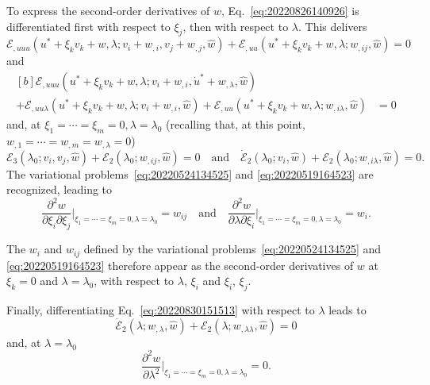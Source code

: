 \documentclass[12pt, final]{scrartcl}
\theoremstyle{definition}
\newcommand{\E}{\mathcal E}
\begin{document}
To express the second-order derivatives of $w$, Eq.~\eqref{eq:20220826140926}
is differentiated first with respect to $\xi_j$, then with respect to
$\lambda$. This delivers
\begin{equation}
  \E_{,uuu}(u^\ast + \xi_k v_k + w, \lambda; v_i + w_{,i}, v_j + w_{,j}, \hat{w}) + \E_{,uu}(u^\ast + \xi_k v_k + w, \lambda; w_{,ij}, \hat{w}) = 0
\end{equation}
and
\begin{equation}
  \begin{aligned}[b]
    \E_{,uuu}(u^\ast + \xi_k v_k + w, \lambda; v_i + w_{,i}, \dot{u}^\ast + w_{,\lambda}, \hat{w}) &\\
    + \E_{,uu\lambda}(u^\ast + \xi_k v_k + w, \lambda; v_i + w_{,i}, \hat{w}) + \E_{,uu}(u^\ast + \xi_k v_k + w, \lambda; w_{,i\lambda}, \hat{w}) &= 0
  \end{aligned}
\end{equation}
and, at $\xi_1 = \cdots = \xi_m = 0, \lambda = \lambda_0$ (recalling that, at this point,
$w_{,1} = \cdots = w_{, m} = w_{,\lambda} = 0$)
\begin{equation}
  \E_3(\lambda_0; v_i, v_j, \hat{w}) + \E_2(\lambda_0; w_{,ij}, \hat{w}) = 0
  \quad \text{and} \quad
  \dot{\E}_2(\lambda_0; v_i, \hat{w}) + \E_2(\lambda_0; w_{,i\lambda}, \hat{w}) = 0.
\end{equation}
The variational problems~\eqref{eq:20220524134525} and \eqref{eq:20220519164523}
are recognized, leading to
\begin{equation}
  \frac{\partial^2w}{\partial\xi_i \partial\xi_j}\biggr\rvert_{\xi_1 = \cdots = \xi_m = 0, \lambda = \lambda_0} = w_{ij}
  \quad\text{and}\quad
  \frac{\partial^2w}{\partial\lambda \partial\xi_i}\biggr\rvert_{\xi_1 = \cdots = \xi_m = 0, \lambda = \lambda_0} = w_{i}.
\end{equation}

The $w_i$ and $w_{ij}$ defined by the variational
problems~\eqref{eq:20220524134525} and \eqref{eq:20220519164523} therefore
appear as the second-order derivatives of $w$ at $\xi_k = 0$ and $\lambda = \lambda_0$,
with respect to $\lambda$, $\xi_i$ and $\xi_i$, $\xi_j$.

Finally, differentiating Eq.~\eqref{eq:20220830151513} with respect to $\lambda$ leads to
\begin{equation}
  \dot{\E}_2(\lambda; w_{,\lambda}, \hat{w}) + \E_2(\lambda; w_{,\lambda\lambda}, \hat{w}) = 0
\end{equation}
and, at $\lambda = \lambda_0$
\begin{equation}
  \frac{\partial^2w}{\partial\lambda^2}\biggr\rvert_{\xi_1 = \cdots = \xi_m = 0, \lambda = \lambda_0} = 0.
\end{equation}
\end{document}
